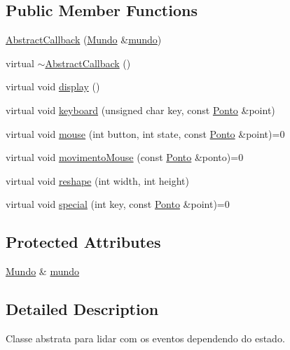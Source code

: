 \subsection*{Public Member Functions}
\begin{DoxyCompactItemize}
\item 
\hyperlink{classAbstractCallback_ab410b1edcdfab5a74298edb8ee9cb4a9}{Abstract\+Callback} (\hyperlink{classMundo}{Mundo} \&\hyperlink{classAbstractCallback_a17c2460462c7e985368ef227338d3430}{mundo})
\item 
virtual \hyperlink{classAbstractCallback_a5ae7f5e51738a94b7dab97555babf40d}{$\sim$\+Abstract\+Callback} ()
\item 
virtual void \hyperlink{classAbstractCallback_aabd79b70b927b64276000d3d17959841}{display} ()
\item 
virtual void \hyperlink{classAbstractCallback_af897d4ee16944785ddb2d90ffad155b2}{keyboard} (unsigned char key, const \hyperlink{classPonto}{Ponto} \&point)
\item 
virtual void \hyperlink{classAbstractCallback_a1c30a14b8f6212712152364a6620760d}{mouse} (int button, int state, const \hyperlink{classPonto}{Ponto} \&point)=0
\item 
virtual void \hyperlink{classAbstractCallback_a6a13a67f479eb87c0416d1464b8ef37a}{movimento\+Mouse} (const \hyperlink{classPonto}{Ponto} \&ponto)=0
\item 
virtual void \hyperlink{classAbstractCallback_a649127b2eccaccc9e201073944f65e8c}{reshape} (int width, int height)
\item 
virtual void \hyperlink{classAbstractCallback_a92270c46a72e1b36f8ad72a26f7c37dd}{special} (int key, const \hyperlink{classPonto}{Ponto} \&point)=0
\end{DoxyCompactItemize}
\subsection*{Protected Attributes}
\begin{DoxyCompactItemize}
\item 
\hyperlink{classMundo}{Mundo} \& \hyperlink{classAbstractCallback_a17c2460462c7e985368ef227338d3430}{mundo}
\end{DoxyCompactItemize}


\subsection{Detailed Description}
Classe abstrata para lidar com os eventos dependendo do estado. 

